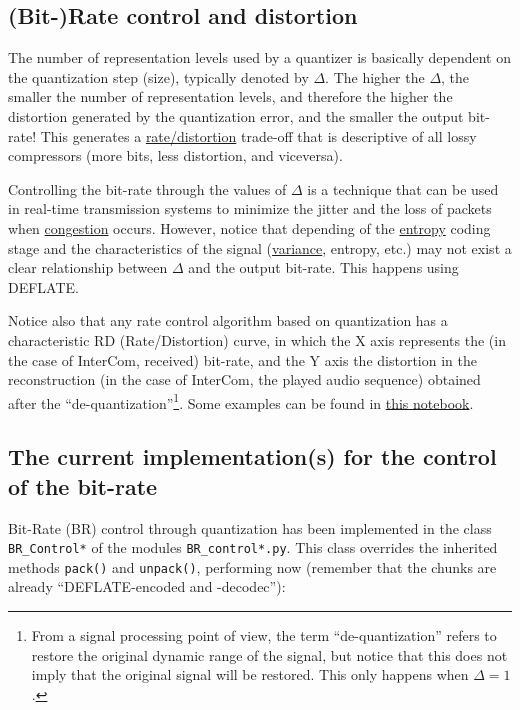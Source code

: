 
\subsection{(Bit-)Rate control and distortion}
The number of representation levels used by a quantizer is basically
dependent on the quantization step (size), typically denoted by
$\Delta$. The higher the $\Delta$, the smaller the number of
representation levels, and therefore the higher the distortion
generated by the quantization error, and the smaller the output
bit-rate! This generates a
\href{https://en.wikipedia.org/wiki/Rate%E2%80%93distortion_theory}{rate/distortion}
  trade-off that is descriptive of all lossy compressors (more bits, less distortion, and viceversa).

Controlling the bit-rate through the values of $\Delta$ is a technique
that can be used in real-time transmission systems to minimize the
jitter and the loss of packets when
\href{https://en.wikipedia.org/wiki/Network_congestion}{congestion}
occurs. However, notice that depending of the
\href{https://en.wikipedia.org/wiki/Entropy_(information_theory)}{entropy}
coding stage and the characteristics of the signal
(\href{https://en.wikipedia.org/wiki/Variance}{variance}, entropy, etc.) may
not exist a clear relationship between $\Delta$ and the output
bit-rate. This happens using DEFLATE.

Notice also that any rate control algorithm based on quantization has
a characteristic RD (Rate/Distortion) curve, in which the X axis
represents the (in the case of InterCom, received) bit-rate, and the Y
axis the distortion in the reconstruction (in the case of InterCom,
the played audio sequence) obtained after the
``de-quantization''\footnote{From a signal processing point of view,
  the term ``de-quantization'' refers to restore the original dynamic
  range of the signal, but notice that this does not imply that the
  original signal will be restored. This only happens when
  $\Delta=1$.}. Some examples can be found in
\href{https://github.com/Tecnologias-multimedia/Tecnologias-multimedia.github.io/blob/master/contents/BR_control/audio_quantization.ipynb}{this
  notebook}.

\subsection{The current implementation(s) for the control of the bit-rate}
Bit-Rate (BR) control through quantization has been implemented in the
class \verb|BR_Control*| of the modules \texttt{BR\_control*.py}. This
class overrides the inherited methods \verb|pack()| and
\verb|unpack()|, performing now (remember that the chunks are already
``DEFLATE-encoded and -decodec''):

